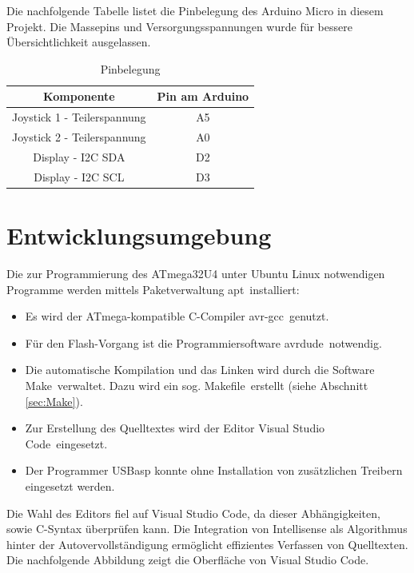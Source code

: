 Die nachfolgende Tabelle listet die Pinbelegung des Arduino Micro in diesem Projekt. Die Massepins und Versorgungsspannungen wurde für bessere Übersichtlichkeit ausgelassen.

\begin{table}[H]
\begin{center}
\caption{Pinbelegung}
\begin{tabular}{|c|c|}
\hline 
Komponente & Pin am Arduino \\ 
\hline
\hline 
Joystick 1 - Teilerspannung & A5 \\ 
\hline 
Joystick 2 - Teilerspannung & A0 \\ 
\hline 
Display - I2C SDA & D2 \\ 
\hline 
Display - I2C SCL & D3 \\ 
\hline 
\end{tabular}
\end{center}
\end{table}

\section{Entwicklungsumgebung}
\label{sec:IDE}
Die zur Programmierung des ATmega32U4 unter Ubuntu Linux notwendigen Programme werden mittels Paketverwaltung \glqq apt\grqq\ installiert:
\begin{itemize}
\setlength\itemsep{-0.5em}
\item Es wird der ATmega-kompatible C-Compiler \glqq avr-gcc\grqq\ genutzt.
\item Für den Flash-Vorgang ist die Programmiersoftware \glqq avrdude\grqq\ notwendig.
\item Die automatische Kompilation und das Linken wird durch die Software \glqq Make\grqq\ verwaltet. Dazu wird ein sog. \glqq Makefile\grqq\ erstellt (siehe Abschnitt \ref{sec:Make}).
\item Zur Erstellung des Quelltextes wird der Editor \glqq Visual Studio Code\grqq\ eingesetzt.
\item Der Programmer USBasp konnte ohne Installation von zusätzlichen Treibern eingesetzt werden.
\end{itemize}
\noindent Die Wahl des Editors fiel auf Visual Studio Code, da dieser Abhängigkeiten, sowie C-Syntax überprüfen kann. Die Integration von Intellisense als Algorithmus hinter der Autovervollständigung ermöglicht effizientes Verfassen von Quelltexten. Die nachfolgende Abbildung zeigt die Oberfläche von Visual Studio Code.


